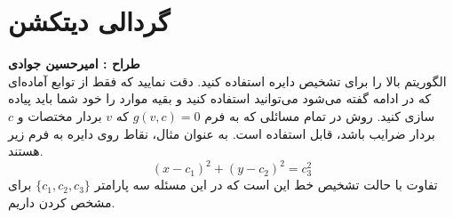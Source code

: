 \documentclass[a4paper]{article}
\begin{document}
\section{گردالی دیتکشن}
\textbf{طراح :‌ امیرحسین جوادی}
\vspace{0.5cm}
\\
الگوریتم بالا را برای تشخیص دایره استفاده کنید. دقت نمایید که فقط از توابع آماده‌ای که در ادامه گفته می‌شود می‌توانید استفاده کنید و بقیه موارد را خود شما باید پیاده سازی کنید. 
روش 
در تمام مسائلی که به فرم 
$ g(v,c) = 0  $ 
که $ v $ بردار مختصات و $ c $ بردار ضرایب باشد، قابل استفاده است. به عنوان مثال، نقاط روی دایره به فرم زیر هستند.
\begin{equation*}
	 (x - c_{1})^{2} + (y - c_{2})^{2} = c_{3}^{2}
\end{equation*}
تفاوت با حالت تشخیص خط این است که در این مسئله سه پارامتر 
$ \{c_{1},c_{2},c_{3}\} $ 
برای مشخص کردن داریم. 
\end{document}

